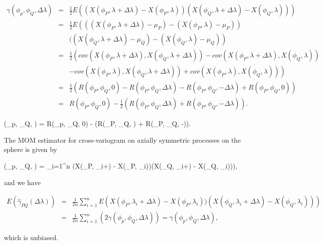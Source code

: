 	
	\begin{eqnarray*}
		\gamma(\phi_p, \phi_Q, \Delta\lambda) &=& \frac{1}{2}E\left((X(\phi_P, \lambda+\Delta \lambda) - X(\phi_P, \lambda))(X(\phi_Q, \lambda+\Delta \lambda) - X(\phi_Q, \lambda))\right) \\
		&=& \frac{1}{2} E\left(((X(\phi_P, \lambda+\Delta \lambda) - \mu_P) - (X(\phi_P, \lambda)- \mu_P)) \right. \\
		& & \left.((X(\phi_Q, \lambda+\Delta \lambda) - \mu_Q) - (X(\phi_Q, \lambda) - \mu_Q)\right) \\
		&=& \frac{1}{2} \left(cov(X(\phi_P, \lambda+\Delta \lambda), X(\phi_Q, \lambda+\Delta \lambda)) - cov(X(\phi_P, \lambda+\Delta \lambda), X(\phi_Q, \lambda)) \right. \\
		& & \left. - cov(X(\phi_P, \lambda), X(\phi_Q, \lambda + \Delta \lambda)) + cov(X(\phi_P, \lambda), X(\phi_Q, \lambda))  \right) \\
		&=& \frac{1}{2} \left(R(\phi_P, \phi_Q, 0) - R(\phi_P, \phi_Q, \Delta \lambda) - R(\phi_P, \phi_Q, -\Delta \lambda) + R(\phi_P, \phi_Q, 0)  \right) \\
		&=& R(\phi_P, \phi_Q, 0) - \frac{1}{2}(R(\phi_P, \phi_Q, \Delta \lambda) + R(\phi_P, \phi_Q, -\Delta \lambda)).
	\end{eqnarray*}
	
	\beq
	\gamma(\phi_p, \phi_Q, \Delta\lambda) =  R(\phi_p, \phi_Q, 0) - (R(\phi_P, \phi_Q, \Delta \lambda) + R(\phi_P, \phi_Q, -\Delta \lambda)).
	\eeq 
	
	The MOM estimator for cross-variogram on axially symmetric processes on the sphere is given by
	
	\beq
	\hat{\gamma}(\phi_p, \phi_Q, \Delta\lambda) =  \sum_{i=1}^n \left(X(\phi_P, \lambda_i+\Delta \lambda) - X(\phi_P, \lambda_i))(X(\phi_Q, \lambda_i+\Delta \lambda) - X(\phi_Q, \lambda_i))\right),
	\eeq
	
	and we have
	
	
	\begin{eqnarray*}
		E(\hat{\gamma}_{PQ}(\Delta \lambda)) &=& \frac{1}{2n} \sum_{i=1}^n E\left(X(\phi_P, \lambda_i+\Delta \lambda) - X(\phi_P, \lambda_i))(X(\phi_Q, \lambda_i+\Delta \lambda) - X(\phi_Q, \lambda_i))\right) \\
		&=& \frac{1}{2n} \sum_{i=1}^n \left( 2\gamma(\phi_p, \phi_Q, \Delta\lambda) \right) = \gamma(\phi_p, \phi_Q, \Delta\lambda),
	\end{eqnarray*}
	
	which is unbiased. \\
	
